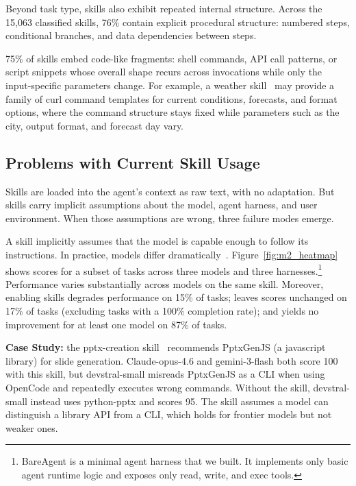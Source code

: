 Beyond task type, skills also exhibit repeated internal
structure. Across the 15,063 classified skills, 76\%
contain explicit procedural structure: numbered steps,
conditional branches, and data dependencies between steps.

75\% of skills embed code-like fragments: shell
commands, API call patterns, or script snippets whose overall
shape recurs across invocations while only the input-specific
parameters change.
For example, a weather skill~\cite{openclaw} may provide a family of curl command
templates for current conditions, forecasts, and format options, where
the command structure stays fixed while parameters such as the city,
output format, and forecast day vary.


\subsection{Problems with Current Skill Usage}
\label{sec:insight:problems}

Skills are loaded into the agent's context as raw text, with no adaptation.
But skills carry implicit assumptions about the model, agent harness, and user environment.
When those assumptions are wrong, three failure modes emerge.

A skill implicitly assumes that the model is capable enough
to follow its instructions. In practice, models differ
dramatically~\cite{lu2024agentbench}. 
Figure~\ref{fig:m2_heatmap} shows scores for
a subset of tasks across three models and three harnesses.\footnote{BareAgent is a minimal agent harness that we built. It implements only basic agent runtime logic and exposes only read, write, and exec tools.}
Performance varies substantially across models on the same skill.
Moreover, enabling skills degrades performance on 15\% of tasks; leaves scores unchanged on 17\% of tasks (excluding tasks with a 100\% completion rate); and yields no improvement for at least one model on 87\% of tasks.
\begin{examplebox}
\textbf{Case Study:} the pptx-creation skill~\cite{anthropic-skills-repo}
recommends PptxGenJS (a javascript library) for slide generation.
Claude-opus-4.6 and gemini-3-flash both score 100 with this skill,
but devstral-small misreads PptxGenJS as a CLI when using OpenCode
and repeatedly executes wrong commands.
Without the skill, devstral-small instead uses python-pptx and scores 95.
The skill assumes a model can distinguish a library API from a CLI,
which holds for frontier models but not weaker ones.
\end{examplebox}


